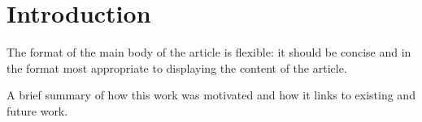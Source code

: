 \section*{Introduction} 
The format of the main body of the article is flexible: it should be concise and in the format most appropriate to displaying the content of the article.

A brief summary of how this work was motivated and how it links to existing and future work.